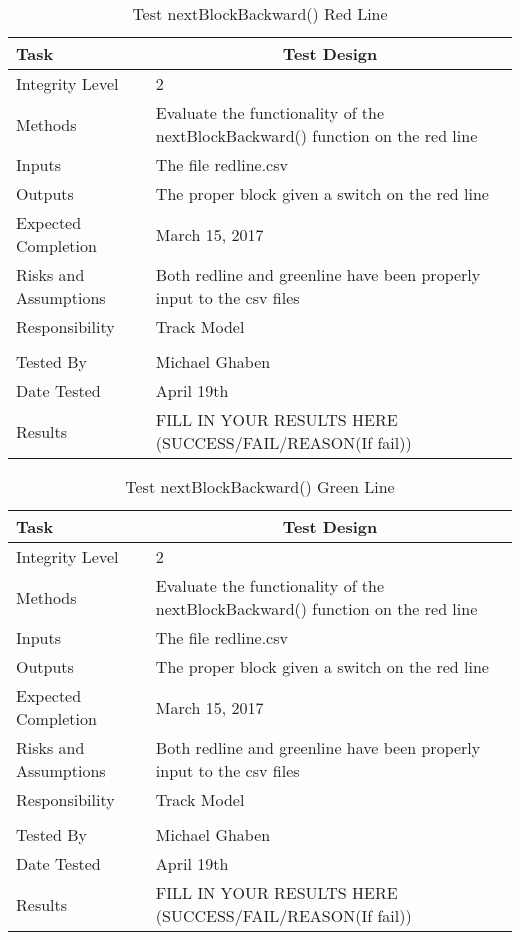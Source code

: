 \documentclass[]{article}
\begin{document}
\begin{table}[H]
	\centering
	\caption{Test nextBlockBackward() Red Line}
	\begin{tabular}{|l|l|}
		\hline
		Task & \multicolumn{1}{c|}{Test Design} \\ \hline
		Integrity Level & 2 \\ \hline
		Methods & \parbox[t]{10cm}{Evaluate the functionality of the nextBlockBackward() function on the red line} \\ \hline
		Inputs &  The file redline.csv \\ \hline
		Outputs &  The proper block given a switch on the red line\\ \hline
		Expected Completion & March 15, 2017\\ \hline
		Risks and Assumptions & Both redline and greenline have been properly input to the csv files \\ \hline
		Responsibility & Track Model\\ \hline
		\\ \hline
		Tested By   &  Michael Ghaben\\	\hline
		Date Tested & \parbox[t]{10cm}{April 19th}\\ \hline
		Results & FILL IN YOUR RESULTS HERE (SUCCESS/FAIL/REASON(If fail))\\ \hline
	\end{tabular}
\end{table}

\begin{table}[H]
	\centering
	\caption{Test nextBlockBackward() Green Line}
	\begin{tabular}{|l|l|}
		\hline
		Task & \multicolumn{1}{c|}{Test Design} \\ \hline
		Integrity Level & 2 \\ \hline
		Methods & \parbox[t]{10cm}{Evaluate the functionality of the nextBlockBackward() function on the red line} \\ \hline
		Inputs &  The file redline.csv \\ \hline
		Outputs &  The proper block given a switch on the red line\\ \hline
		Expected Completion & March 15, 2017\\ \hline
		Risks and Assumptions & Both redline and greenline have been properly input to the csv files \\ \hline
		Responsibility & Track Model\\ \hline
		\\ \hline
		Tested By   &  Michael Ghaben\\	\hline
		Date Tested & \parbox[t]{10cm}{April 19th}\\ \hline
		Results & FILL IN YOUR RESULTS HERE (SUCCESS/FAIL/REASON(If fail))\\ \hline
	\end{tabular}
\end{table}
\end{document}
